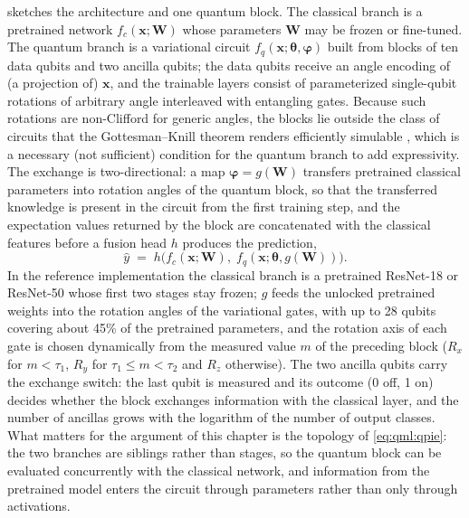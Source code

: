  sketches the architecture and one quantum block. The classical branch is a pretrained network $f_c(\bm{x}; \bm{W})$ whose parameters $\bm{W}$ may be frozen or fine-tuned. The quantum branch is a variational circuit $f_q(\bm{x}; \bm{\theta}, \bm{\varphi})$ built from blocks of ten data qubits and two ancilla qubits; the data qubits receive an angle encoding of (a projection of) $\bm{x}$, and the trainable layers consist of parameterized single-qubit rotations of arbitrary angle interleaved with entangling gates. Because such rotations are non-Clifford for generic angles, the blocks lie outside the class of circuits that the Gottesman--Knill theorem renders efficiently simulable \cite{aaronson2004stabilizer}, which is a necessary (not sufficient) condition for the quantum branch to add expressivity. The exchange is two-directional: a map $\bm{\varphi} = g(\bm{W})$ transfers pretrained classical parameters into rotation angles of the quantum block, so that the transferred knowledge is present in the circuit from the first training step, and the expectation values returned by the block are concatenated with the classical features before a fusion head $h$ produces the prediction,
\begin{equation}\label{eq:qml:qpie}
\hat{y} \;=\; h\big(f_c(\bm{x}; \bm{W}),\; f_q(\bm{x}; \bm{\theta}, g(\bm{W}))\big).
\end{equation}
In the reference implementation \cite{guo2025qpie} the classical branch is a pretrained ResNet-18 or ResNet-50 whose first two stages stay frozen; $g$ feeds the unlocked pretrained weights into the rotation angles of the variational gates, with up to 28 qubits covering about 45\% of the pretrained parameters, and the rotation axis of each gate is chosen dynamically from the measured value $m$ of the preceding block ($R_x$ for $m<\tau_1$, $R_y$ for $\tau_1\le m<\tau_2$ and $R_z$ otherwise). The two ancilla qubits carry the exchange switch: the last qubit is measured and its outcome (0 off, 1 on) decides whether the block exchanges information with the classical layer, and the number of ancillas grows with the logarithm of the number of output classes. What matters for the argument of this chapter is the topology of \cref{eq:qml:qpie}: the two branches are siblings rather than stages, so the quantum block can be evaluated concurrently with the classical network, and information from the pretrained model enters the circuit through parameters rather than only through activations.

